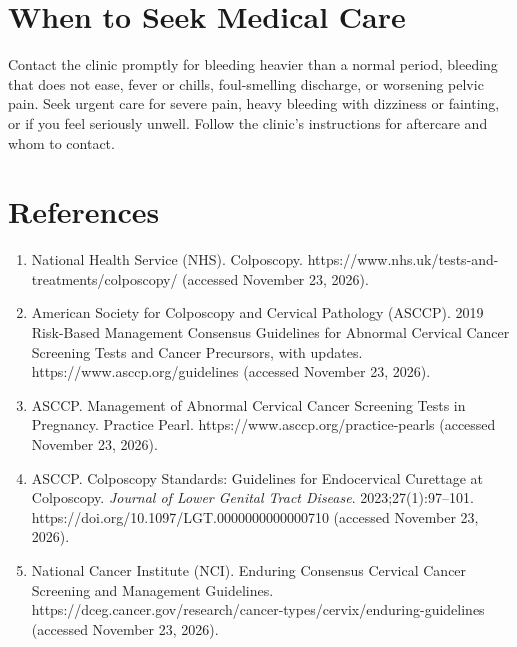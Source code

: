 \section*{When to Seek Medical Care}
Contact the clinic promptly for bleeding heavier than a normal period, bleeding that does not ease, fever or chills, foul-smelling discharge, or worsening pelvic pain. Seek urgent care for severe pain, heavy bleeding with dizziness or fainting, or if you feel seriously unwell. Follow the clinic's instructions for aftercare and whom to contact.

\section*{References}
\begin{enumerate}
  \item National Health Service (NHS). Colposcopy. https://www.nhs.uk/tests-and-treatments/colposcopy/ (accessed November 23, 2026).
  \item American Society for Colposcopy and Cervical Pathology (ASCCP). 2019 Risk-Based Management Consensus Guidelines for Abnormal Cervical Cancer Screening Tests and Cancer Precursors, with updates. https://www.asccp.org/guidelines (accessed November 23, 2026).
  \item ASCCP. Management of Abnormal Cervical Cancer Screening Tests in Pregnancy. Practice Pearl. https://www.asccp.org/practice-pearls (accessed November 23, 2026).
  \item ASCCP. Colposcopy Standards: Guidelines for Endocervical Curettage at Colposcopy. \textit{Journal of Lower Genital Tract Disease}. 2023;27(1):97--101. https://doi.org/10.1097/LGT.0000000000000710 (accessed November 23, 2026).
  \item National Cancer Institute (NCI). Enduring Consensus Cervical Cancer Screening and Management Guidelines. https://dceg.cancer.gov/research/cancer-types/cervix/enduring-guidelines (accessed November 23, 2026).
\end{enumerate}
\clearpage
